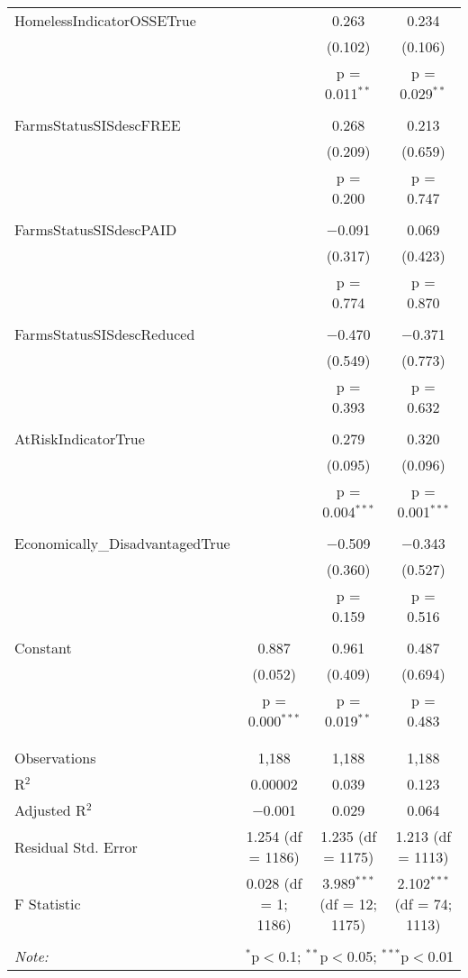 \begin{table}[!htbp]
\begin{tabular}{@{\extracolsep{5pt}}lccc}
 HomelessIndicatorOSSETrue &  & 0.263 & 0.234 \\ 
  &  & (0.102) & (0.106) \\ 
  &  & p = 0.011$^{**}$ & p = 0.029$^{**}$ \\ 
  & & & \\ 
 FarmsStatusSISdescFREE &  & 0.268 & 0.213 \\ 
  &  & (0.209) & (0.659) \\ 
  &  & p = 0.200 & p = 0.747 \\ 
  & & & \\ 
 FarmsStatusSISdescPAID &  & $-$0.091 & 0.069 \\ 
  &  & (0.317) & (0.423) \\ 
  &  & p = 0.774 & p = 0.870 \\ 
  & & & \\ 
 FarmsStatusSISdescReduced &  & $-$0.470 & $-$0.371 \\ 
  &  & (0.549) & (0.773) \\ 
  &  & p = 0.393 & p = 0.632 \\ 
  & & & \\ 
 AtRiskIndicatorTrue &  & 0.279 & 0.320 \\ 
  &  & (0.095) & (0.096) \\ 
  &  & p = 0.004$^{***}$ & p = 0.001$^{***}$ \\ 
  & & & \\ 
 Economically\_DisadvantagedTrue &  & $-$0.509 & $-$0.343 \\ 
  &  & (0.360) & (0.527) \\ 
  &  & p = 0.159 & p = 0.516 \\ 
  & & & \\ 
 Constant & 0.887 & 0.961 & 0.487 \\ 
  & (0.052) & (0.409) & (0.694) \\ 
  & p = 0.000$^{***}$ & p = 0.019$^{**}$ & p = 0.483 \\ 
  & & & \\ 
\hline \\[-1.8ex] 
Observations & 1,188 & 1,188 & 1,188 \\ 
R$^{2}$ & 0.00002 & 0.039 & 0.123 \\ 
Adjusted R$^{2}$ & $-$0.001 & 0.029 & 0.064 \\ 
Residual Std. Error & 1.254 (df = 1186) & 1.235 (df = 1175) & 1.213 (df = 1113) \\ 
F Statistic & 0.028 (df = 1; 1186) & 3.989$^{***}$ (df = 12; 1175) & 2.102$^{***}$ (df = 74; 1113) \\ 
\hline 
\hline \\[-1.8ex] 
\textit{Note:}  & \multicolumn{3}{r}{$^{*}$p$<$0.1; $^{**}$p$<$0.05; $^{***}$p$<$0.01} \\ 
\end{tabular} 
\end{table} 

